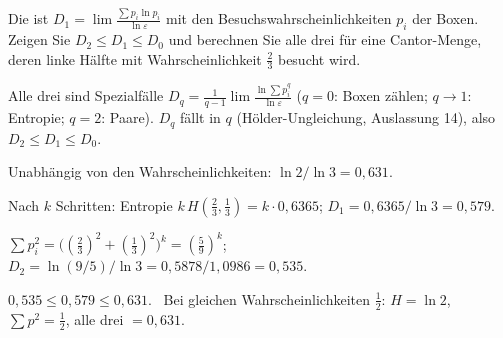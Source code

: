 \begin{aufgabe}
Die  ist $D_1 = \lim\frac{\sum p_i\ln p_i}{\ln\varepsilon}$ mit den Besuchswahrscheinlichkeiten $p_i$ der Boxen. Zeigen Sie $D_2 \le D_1 \le D_0$ und berechnen Sie alle drei für eine Cantor-Menge, deren linke Hälfte mit Wahrscheinlichkeit $\tfrac23$ besucht wird.

\loesung
{}
Alle drei sind Spezialfälle $D_q = \frac{1}{q-1}\lim\frac{\ln\sum p_i^{q}}{\ln\varepsilon}$ ($q = 0$: Boxen zählen; $q \to 1$: Entropie; $q = 2$: Paare). $D_q$ fällt in $q$ (Hölder-Ungleichung, Auslassung 14), also $D_2 \le D_1 \le D_0$.

Unabhängig von den Wahrscheinlichkeiten: $\ln2/\ln3 = 0{,}631$.

Nach $k$ Schritten: Entropie $k\,H(\tfrac23,\tfrac13) = k\cdot0{,}6365$; $D_1 = 0{,}6365/\ln3 = 0{,}579$.

$\sum p_i^{2} = \bigl((\tfrac23)^{2} + (\tfrac13)^{2}\bigr)^{k} = (\tfrac59)^{k}$; $D_2 = \ln(9/5)/\ln3 = 0{,}5878/1{,}0986 = 0{,}535$.

$0{,}535 \le 0{,}579 \le 0{,}631$. \checkmark\ Bei gleichen Wahrscheinlichkeiten $\tfrac12$: $H = \ln2$, $\sum p^{2} = \tfrac12$, alle drei $= 0{,}631$. \checkmark

\begin{center}
\begin{minipage}{0.88\textwidth}
\end{minipage}
\end{center}
\end{aufgabe}

